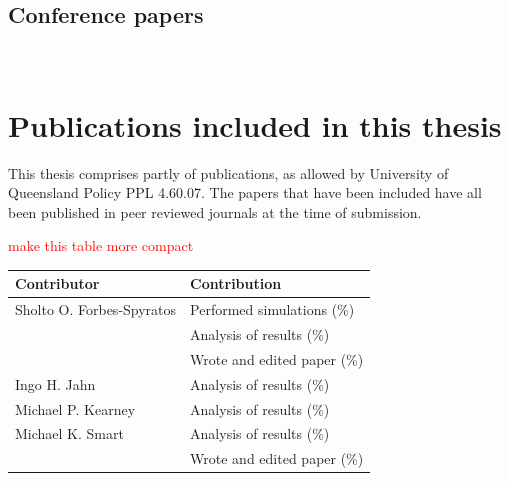 \noindent{}\\


\subsection*{Conference papers}

\noindent{}\\


\section*{Publications included in this thesis}

This thesis comprises partly of publications, as allowed by University of Queensland Policy PPL 4.60.07. The papers that have been included have all been published in peer reviewed journals at the time of submission. 


\textcolor{red}{make this table more compact}


\vspace{\baselineskip}

\begin{center}
  \begin{tabular}{ll}
    \toprule
    Contributor   & Contribution \\
    \midrule
    Sholto O. Forbes-Spyratos             
                                  & Performed simulations (\%)\\
                                  & Analysis of results (\%)\\
                                  & Wrote and edited paper (\%)\\
    \midrule
    Ingo H. Jahn            
                                  & Analysis of results (\%)\\
                                  
        \midrule
        Michael P. Kearney            
								      & Analysis of results (\%)\\                          

    \midrule
    Michael K. Smart              
                                  & Analysis of results (\%)\\
                                  & Wrote and edited paper (\%)\\
    \bottomrule
  \end{tabular}
\end{center}



